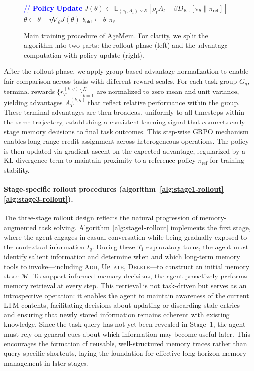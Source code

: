 \begin{figure}[!hbtp]
\begin{minipage}[t]{0.48\textwidth}
\begin{algorithm}[H]
\begin{algorithmic}[1]
        \EndFor
    \EndFor
\EndFor
\State \textcolor{blue}{// \textbf{Policy Update}}
\State $J(\theta) \gets \mathbb{E}_{(e_t, A_t) \sim \mathcal{E}} [\rho_t A_t - \beta D_{\text{KL}}[\pi_{\theta}\|\pi_{\text{ref}}]]$
\State $\theta \gets \theta + \eta \nabla_{\theta} J(\theta)$
\State $\theta_{\text{old}} \gets \theta$ 
\State \Return $\pi_{\theta}$
\end{algorithmic}
\end{algorithm}
\end{minipage}
\caption{Main training procedure of AgeMem. For clarity, we split the algorithm into two parts: the rollout phase (left) and the advantage computation with policy update (right).}
\label{fig:main-algo}
\end{figure}

After the rollout phase, we apply group-based advantage normalization to enable fair comparison across tasks with different reward scales. For each task group $G_q$, terminal rewards $\{r_T^{(k,q)}\}_{k=1}^K$ are normalized to zero mean and unit variance, yielding advantages $A_T^{(k,q)}$ that reflect relative performance within the group. These terminal advantages are then broadcast uniformly to all timesteps within the same trajectory, establishing a consistent learning signal that connects early-stage memory decisions to final task outcomes. This step-wise GRPO mechanism enables long-range credit assignment across heterogeneous operations. The policy is then updated via gradient ascent on the expected advantage, regularized by a KL divergence term to maintain proximity to a reference policy $\pi_{\text{ref}}$ for training stability.


\paragraph{Stage-specific rollout procedures (algorithm~\ref{alg:stage1-rollout}--\ref{alg:stage3-rollout}).}
The three-stage rollout design reflects the natural progression of memory-augmented task solving. Algorithm~\ref{alg:stage1-rollout} implements the first stage, where the agent engages in casual conversation while being gradually exposed to the contextual information $I_q$. During these $T_1$ exploratory turns, the agent must identify salient information and determine when and which long-term memory tools to invoke—including \textsc{Add}, \textsc{Update}, \textsc{Delete}—to construct an initial memory store $\mathcal{M}$. To support informed memory decisions, the agent proactively performs memory retrieval at every step. This retrieval is not task-driven but serves as an introspective operation: it enables the agent to maintain awareness of the current LTM contents, facilitating decisions about updating or discarding stale entries and ensuring that newly stored information remains coherent with existing knowledge. Since the task query has not yet been revealed in Stage~1, the agent must rely on general cues about which information may become useful later. This encourages the formation of reusable, well-structured memory traces rather than query-specific shortcuts, laying the foundation for effective long-horizon memory management in later stages.

